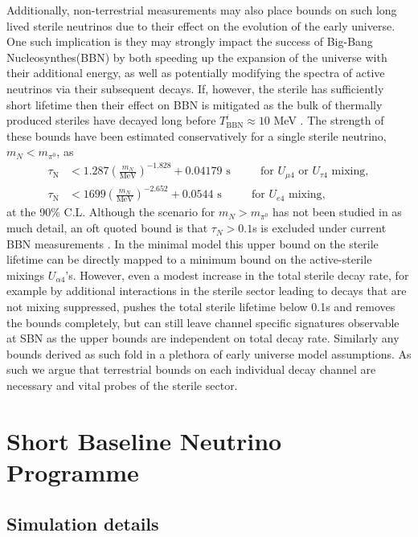 \documentclass[11pt, a4paper]{article}
\begin{document}
Additionally, non-terrestrial measurements may also place bounds on such long
lived sterile neutrinos due to their effect on the evolution of the early
universe. One such implication is they may strongly impact the success of
Big-Bang Nucleosynthes(BBN) by both speeding up the expansion of the universe
with their additional energy, as well as potentially modifying the spectra of
active neutrinos via their subsequent decays. If, however, the sterile has
sufficiently short lifetime  then their effect on BBN is mitigated as the bulk
of thermally produced steriles have decayed long before $T^i_\text{BBN} \approx
10$ MeV \cite{Fields:2006ga}. The strength of these bounds have been estimated
conservatively for a single sterile neutrino, $m_N < m_{\pi^0}$, as
\cite{Dolgov:2000jw,Dolgov:2000pj}
%
\begin{align*}
	\tau_\text{N} &< 1.287 \left( \frac{m_N}{\text{MeV}}\right)^{-1.828}+0.04179 \text{  s    $\qquad$  for $U_{\mu 4}$ or $U_{\tau 4}$ mixing},\\
	\tau_\text{N} &< 1699 \left( \frac{m_N}{\text{MeV}}\right)^{-2.652}+0.0544 \text{  s    $\qquad$  for $U_{e 4}$ mixing},
\end{align*}
%
at the 90\% C.L. Although the scenario for $m_N > m_{\pi^0}$ has not been
studied in as much detail, an oft quoted bound is that $\tau_N > 0.1$s is
excluded under current BBN measurements \cite{Dolgov:2000j}. In the minimal
model this upper bound on the sterile lifetime can be directly mapped to a
minimum bound on the active-sterile mixings $U_{\alpha 4}$'s. However, even a
modest increase in the total sterile decay rate, for example by additional
interactions in the sterile sector leading to decays that are not mixing
suppressed, pushes the total sterile lifetime below 0.1s and removes the bounds
completely, but can still leave channel specific signatures observable at SBN
as the upper bounds are independent on total decay rate. Similarly any bounds
derived as such fold in a plethora of early universe model assumptions. As such
we argue that terrestrial bounds on each individual decay channel are necessary
and vital probes of the sterile sector. \\

\section{\label{sec:simulation}Short Baseline Neutrino Programme}

\subsection{Simulation details}
\end{document}
